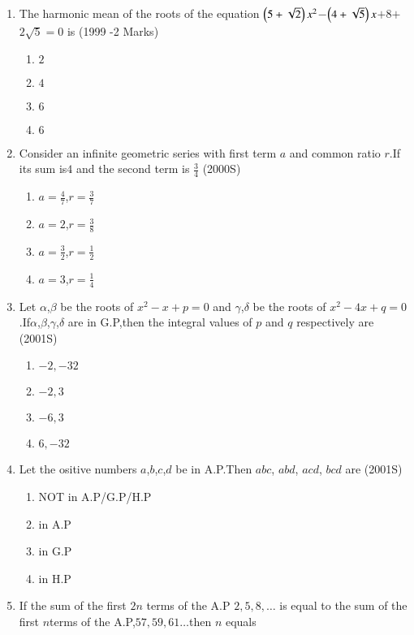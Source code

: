 \documentclass[journal,12pt,twocolumn]{IEEEtran}
\theoremstyle{remark}
\begin{document}
\begin{enumerate} [start=5]
\begin{enumerate}
        \item $5$
        \item $6$
    \end{enumerate}
    \item The harmonic mean of the roots of the equation $\left(5+\sqrt{2}\right)x^2$$-$$\left(4+\sqrt{5}\right)x$$+$$8$$+$$2\sqrt{5}$$=$$0$ is 
    \hfill(1999 -2 Marks)
    \begin{enumerate}
        \item $2$
        \item $4$
        \item $6$
        \item $6$
    \end{enumerate}
    \item Consider an infinite geometric series with first term $a$ and common ratio $r$.If its sum is$4$ and the second term is $\frac{3}{4}$
    \hfill(2000S)
    \begin{enumerate}
        \item $a=\frac{4}{7}$,$r=\frac{3}{7}$
        \item $a=2$,$r=\frac{3}{8}$
        \item $a=\frac{3}{2}$,$r=\frac{1}{2}$
        \item $a=3$,$r=\frac{1}{4}$
    \end{enumerate}
    \item Let $\alpha$,$\beta$ be the roots of $x^2-x+p$$=$$0$ and $\gamma $,$\delta$ be the roots of $x^2-4x+q$$=$$0$.If$ \alpha$,$\beta$,$\gamma$,$\delta$ are in G.P,then the integral values of $p$ and $q$ respectively are
    \hfill(2001S)
    \begin{enumerate}
        \item $-2,-32$
        \item $-2,3$
        \item $-6,3$
        \item $6,-32$
    \end{enumerate}
    \item Let the ositive numbers $a$,$b$,$c$,$d$ be in A.P.Then $abc$, $abd$, $acd$, $bcd$ are
    \hfill(2001S)
    \begin{enumerate}
        \item NOT  in A.P/G.P/H.P
        \item in A.P
        \item in G.P
        \item in H.P
    \end{enumerate}
    \item If the sum  of the first $2n$ terms of the A.P $2,5,8,\dots$ is equal to the sum of the first $n$terms of the A.P,$57,59,61\dots$then $n$ equals

\end{enumerate}
\end{document}

